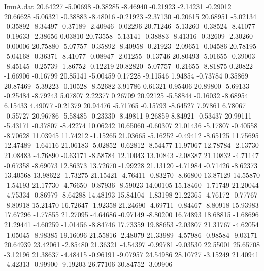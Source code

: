 \begin{filecontents}{ImuA.dat}
  20.64227   -5.00698   -0.38285   -8.46940   -0.21923   -2.14231   -0.29012
  20.66628   -5.06321   -0.38883   -8.48016   -0.21923   -2.37130   -0.20615
  20.68951   -5.02134   -0.35892   -8.34497   -0.37189   -2.40946   -0.02296
  20.71246   -5.13260   -0.38524   -8.41077   -0.19633   -2.38656    0.03810
  20.73558   -5.13141   -0.38883   -8.41316   -0.32609   -2.30260   -0.00006
  20.75880   -5.07757   -0.35892   -8.40958   -0.21923   -2.09651   -0.04586
  20.78195   -5.04168   -0.36371   -8.41077   -0.08947   -2.01255   -0.13746
  20.80493   -5.01655   -0.39003   -8.45145   -0.25739   -1.86752   -0.12219
  20.82820   -5.07757   -0.21655   -8.81875    0.20822   -1.66906   -0.16799
  20.85141   -5.00459    0.17228   -9.11546    1.94854   -0.73784    0.35869
  20.87469   -5.39223   -0.10528   -8.52682    3.91786    0.61321    0.95406
  20.89800   -5.69133   -0.25484   -8.79243    5.07807    2.22377    0.26709
  20.92125   -5.58844   -0.16032   -8.68954    6.15433    4.49077   -0.21379
  20.94476   -5.71765   -0.15793   -8.64527    7.97861    6.78067   -0.55727
  20.96786   -5.58485   -0.23330   -8.49811    9.26859    8.84921   -0.53437
  20.99111   -5.43171   -0.37807   -8.42274   10.06242   10.65060   -0.60307
  21.01436   -5.17807   -0.40558   -8.70628   11.03945   11.74212   -1.15265
  21.03665   -5.16252   -0.49412   -8.65125   11.75695   12.47489   -1.64116
  21.06183   -5.02852   -0.62812   -8.54477   11.97067   12.78784   -2.13730
  21.08483   -4.76890   -0.63171   -8.58784   12.10043   13.10843   -2.08387
  21.10832   -4.71147   -0.67358   -8.69073   12.86373   13.72670   -1.99228
  21.13120   -4.71984   -0.71426   -8.62373   13.40568   13.98622   -1.73275
  21.15421   -4.76411   -0.83270   -8.66800   13.87129   14.55870   -1.54193
  21.17730   -4.76650   -0.87936   -8.59023   14.00105   15.18460   -1.71749
  21.20044   -4.75334   -0.86979   -8.64288   14.48193   15.84104   -1.83198
  21.22365   -4.76172   -0.77767   -8.80918   15.21470   16.72647   -1.92358
  21.24690   -4.69711   -0.84467   -8.80918   15.93983   17.67296   -1.77855
  21.27095   -4.64686   -0.97149   -8.80200   16.74893   18.68815   -1.68696
  21.29441   -4.60259   -1.01456   -8.84746   17.73359   19.88653   -2.03807
  21.31767   -4.62054   -1.05045   -8.98385   19.16096   21.55816   -2.48079
  21.33989   -4.57986   -0.98584   -9.03171   20.64939   23.42061   -2.85480
  21.36321   -4.54397   -0.99781   -9.03530   22.55001   25.65708   -3.12196
  21.38637   -4.48415   -0.96191   -9.07957   24.54986   28.10727   -3.15249
  21.40941   -4.42313   -0.99900   -9.19203   26.77106   30.84752   -3.09906

\end{filecontents}
